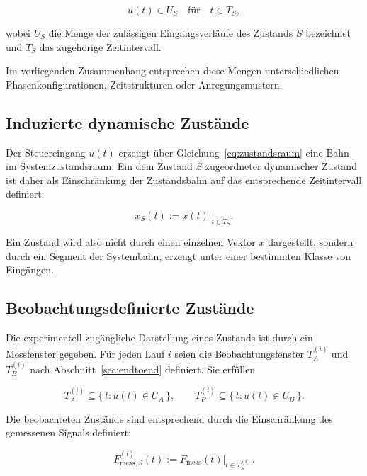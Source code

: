\documentclass[12pt,a4paper]{report}
\begin{document}
\begin{equation}
u(t) \in U_S \quad \text{für} \quad t \in T_S,
\label{eq:steuerzustand}
\end{equation}

wobei $U_S$ die Menge der zulässigen Eingangsverläufe des Zustands $S$
bezeichnet und $T_S$ das zugehörige Zeitintervall.

Im vorliegenden Zusammenhang entsprechen diese Mengen unterschiedlichen
Phasenkonfigurationen, Zeitstrukturen oder Anregungsmustern.

\subsection{Induzierte dynamische Zustände}

Der Steuereingang $u(t)$ erzeugt über
Gleichung~\eqref{eq:zustandsraum} eine Bahn im Systemzustandsraum. Ein
dem Zustand $S$ zugeordneter dynamischer Zustand ist daher als
Einschränkung der Zustandsbahn auf das entsprechende Zeitintervall
definiert:

\begin{equation}
x_S(t) := x(t)\big|_{t \in T_S}.
\label{eq:dynzustand}
\end{equation}

Ein Zustand wird also nicht durch einen einzelnen Vektor $x$ dargestellt,
sondern durch ein Segment der Systembahn, erzeugt unter einer bestimmten
Klasse von Eingängen.

\subsection{Beobachtungsdefinierte Zustände}

Die experimentell zugängliche Darstellung eines Zustands ist durch ein
Messfenster gegeben. Für jeden Lauf $i$ seien die Beobachtungsfenster
$T_A^{(i)}$ und $T_B^{(i)}$ nach Abschnitt~\ref{sec:endtoend} definiert.
Sie erfüllen

\begin{equation}
T_A^{(i)} \subseteq \{\, t : u(t) \in U_A \,\},
\qquad
T_B^{(i)} \subseteq \{\, t : u(t) \in U_B \,\}.
\label{eq:fensterbedingung}
\end{equation}

Die beobachteten Zustände sind entsprechend durch die Einschränkung des
gemessenen Signals definiert:

\begin{equation}
F_{\mathrm{meas},S}^{(i)}(t) := F_{\mathrm{meas}}(t)\big|_{t \in T_S^{(i)}}.
\label{eq:beobzustand}
\end{equation}
\end{document}
